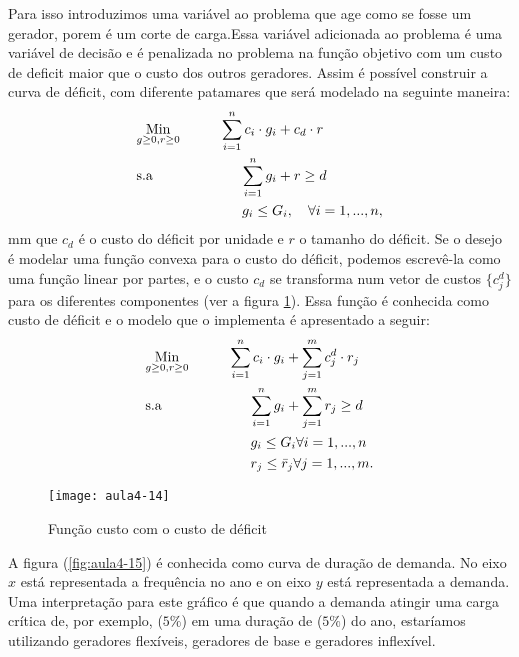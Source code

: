 Para isso introduzimos uma variável ao problema que age como se
fosse um gerador, porem é um corte de carga.Essa variável adicionada ao problema  é uma variável de decisão e é penalizada no problema na função objetivo com um custo de deficit maior que o custo dos outros geradores.
Assim é possível construir a curva de déficit, com diferente patamares
que será modelado na seguinte maneira:
\begin{align}
    & \underset{g\geq0, r\geq0}{\text{Min}} \hspace{1cm} \sum_{i=1}^{n}c_{i}\cdot g_{i} + c_{d}\cdot r \label{eq15} \\
    & \text{s.a}  \hspace{2.2cm} \sum_{i=1}^{n}g_{i} + r\geq d \label{eq16} \\
    &             \hspace{2.65cm}g_{i}\leq G_{i}, \quad \forall i=1,...,n,\label{eq17}
\end{align}
mm que $c_d$ é o custo do déficit por unidade e $r$ o tamanho do déficit.
Se o desejo é modelar uma função convexa para o custo do déficit, podemos escrevê-la como uma função linear por partes, e o custo $c_d$ se transforma num vetor de custos $\{c_j^d\}$ para os diferentes componentes (ver a figura \ref{fig:aula4-14}).
Essa função é conhecida como custo de déficit e o modelo que o implementa é apresentado a seguir:
\begin{align}
    & \underset{g\geq0, r\geq0}{\text{Min}} \hspace{1cm} \sum_{i=1}^{n}c_{i}\cdot g_{i} + \sum_{j=1}^{m}c_{j}^{d}\cdot r_{j} \label{eq16} \\
    & \text{s.a}  \hspace{2.2cm} \sum_{i=1}^{n}g_{i} + \sum_{j=1}^{m}r_{j}\geq d \label{eq17} \\
    &             \hspace{2.65cm}g_{i}\leq G_{i} \forall i=1,...,n\label{eq18}\\
    &                \hspace{2.65cm}r_{j}\leq \bar{r}_{j} \forall j=1,...,m.\label{eq19}
\end{align}
\begin{figure}[H]
\begin{centering}
\texttt{[image: aula4-14]}\protect\caption{\label{fig:aula4-14} Função custo com o custo de déficit }
\end{centering}
\end{figure}
A figura (\ref{fig:aula4-15}) é conhecida como curva de duração de demanda. No eixo $x$ está representada a frequência no ano e on eixo $y$ está representada a demanda. Uma interpretação para este gráfico é que quando a demanda atingir uma carga crítica de, por exemplo, ($5\%$) em uma duração de ($5\%$) do ano, estaríamos utilizando geradores flexíveis, geradores de base e geradores inflexível. 

